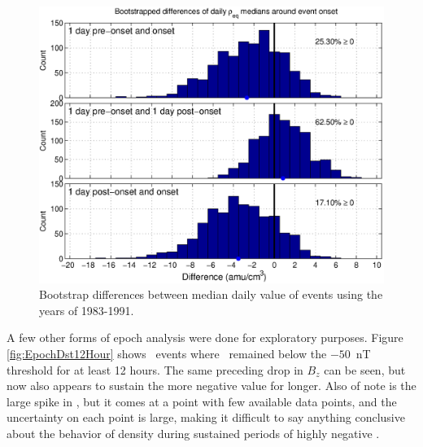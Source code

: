 \begin{figure}[htp!]
	\centering
	\includegraphics[width=1\linewidth]{Figures/DailyBootstrapDifferences-GOES6-case13}
	\caption{Bootstrap differences between median daily value of events using the years of 1983-1991.}
	\label{fig:DailyBootstrapDifferences-full}
\end{figure}

A few other forms of epoch analysis were done for exploratory purposes. Figure \ref{fig:EpochDst12Hour} shows \dst\ events where \dst\ remained below the $-50$~nT threshold for at least 12 hours. The same preceding drop in $B_z$ can be seen, but now also appears to sustain the more negative value for longer. Also of note is the large spike in \req, but it comes at a point with few available data points, and the uncertainty on each point is large, making it difficult to say anything conclusive about the behavior of density during sustained periods of highly negative \dst.

